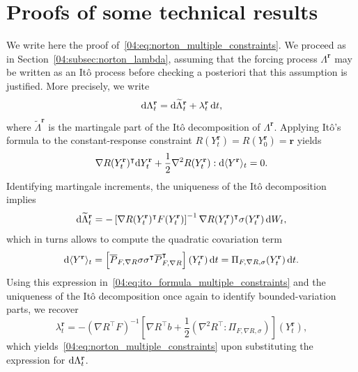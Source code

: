 \section{Proofs of some technical results}
\label{04:appendix:multiple_constraints}
We write here the proof of~\eqref{04:eq:norton_multiple_constraints}.
We proceed as in Section~\ref{04:subsec:norton_lambda}, assuming that the forcing process $\Lambda^{\mathbf r}$ may be written as an Itô process before checking a posteriori that this assumption is justified. More precisely, we write
\[\mathrm{d} \Lambda_t^{\mathbf r} = \mathrm{d} \widetilde{\Lambda}_t^{\mathbf r} + \lambda^{\mathbf r}_t \, \mathrm{d} t,\]
where $\widetilde{\Lambda}^{\mathbf r}$ is the martingale part of the Itô decomposition of $\Lambda^{\mathbf r}$.
Applying Itô's formula to the constant-response constraint $R(Y^{\mathbf r}_t) = R(Y^{\mathbf r}_0)=\mathbf{r}$ yields
\begin{equation}\label{04:eq:ito_formula_multiple_constraints}\nabla R(Y^{\mathbf r}_t)^\intercal\mathrm{d} Y^{\mathbf r}_t + \frac12\nabla^2 R(Y^{\mathbf r}_t) : \mathrm{d} \langle Y^{\mathbf r}\rangle_t = 0.\end{equation}
Identifying martingale increments, the uniqueness of the Itô decomposition implies
\[\mathrm{d} \widetilde{\Lambda}_t^{\mathbf r} = - \left[\nabla R(Y_t^{\mathbf{r}})^\intercal F(Y_t^{\mathbf{r}})\right]^{-1}\nabla R(Y_t^{\mathbf{r}})^\intercal \sigma(Y_t^{\mathbf r}) \,\mathrm{d} W_t,\]
which in turns allows to compute the quadratic covariation term
\[\mathrm{d} \langle Y^{\mathbf r}\rangle_t = \left[\overline{P}_{F,\nabla R} \sigma\sigma ^\intercal \overline{P}_{F,\nabla R}^\intercal\right](Y_t^{\mathbf r})\,\mathrm{d}  t = \Pi_{F,\nabla R,\sigma}(Y_t^{\mathbf r})\, \mathrm{d} t.\]
Using this expression in~\eqref{04:eq:ito_formula_multiple_constraints} and the uniqueness of the Itô decomposition once again to identify bounded-variation parts, we recover
\[\lambda_t^{\mathbf r} = - (\nabla R^\intercal F)^{-1}\left[\nabla R^\intercal b +\frac12\left(\nabla^2 R^\intercal : \Pi_{F,\nabla R,\sigma}\right)\right] (Y_t^{\mathbf{r}}),\]
which yields~\eqref{04:eq:norton_multiple_constraints} upon substituting the expression for $\mathrm{d}\Lambda_t^{\mathbf r}$.

